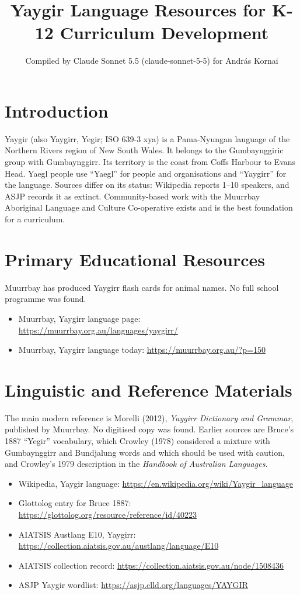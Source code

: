 \documentclass[12pt]{article}
\title{Yaygir Language Resources for K-12 Curriculum Development}
\author{Compiled by Claude Sonnet 5.5 (claude-sonnet-5-5) for Andr\'as Kornai}
\date{}
\begin{document}
\maketitle

\section{Introduction}
Yaygir (also Yaygirr, Yegir; ISO 639-3 xya) is a Pama-Nyungan language of the Northern Rivers region of New South Wales. It belongs to the Gumbaynggiric group with Gumbaynggirr. Its territory is the coast from Coffs Harbour to Evans Head. Yaegl people use ``Yaegl'' for people and organisations and ``Yaygirr'' for the language. Sources differ on its status: Wikipedia reports 1--10 speakers, and ASJP records it as extinct. Community-based work with the Muurrbay Aboriginal Language and Culture Co-operative exists and is the best foundation for a curriculum.

\section{Primary Educational Resources}
Muurrbay has produced Yaygirr flash cards for animal names. No full school programme was found.
\begin{itemize}
\item Muurrbay, Yaygirr language page: \url{https://muurrbay.org.au/languages/yaygirr/}
\item Muurrbay, Yaygirr language today: \url{https://muurrbay.org.au/?p=150}
\end{itemize}

\section{Linguistic and Reference Materials}
The main modern reference is Morelli (2012), \emph{Yaygirr Dictionary and Grammar}, published by Muurrbay. No digitised copy was found. Earlier sources are Bruce's 1887 ``Yegir'' vocabulary, which Crowley (1978) considered a mixture with Gumbaynggirr and Bundjalung words and which should be used with caution, and Crowley's 1979 description in the \emph{Handbook of Australian Languages}.
\begin{itemize}
\item Wikipedia, Yaygir language: \url{https://en.wikipedia.org/wiki/Yaygir_language}
\item Glottolog entry for Bruce 1887: \url{https://glottolog.org/resource/reference/id/40223}
\item AIATSIS Austlang E10, Yaygirr: \url{https://collection.aiatsis.gov.au/austlang/language/E10}
\item AIATSIS collection record: \url{https://collection.aiatsis.gov.au/node/1508436}
\item ASJP Yaygir wordlist: \url{https://asjp.clld.org/languages/YAYGIR}
\end{itemize}
\end{document}
